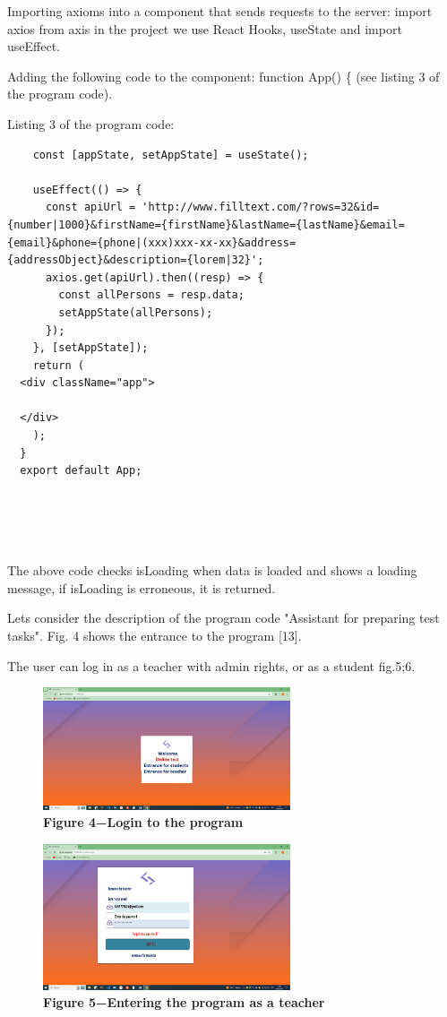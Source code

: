 Importing axioms into a component that sends requests to the server:
import axios from \textquotesingle axis\textquotesingle{} in the project
we use React Hooks, useState and import useEffect.

Adding the following code to the component: function App() \{ (see
listing 3 of the program code).

Listing 3 of the program code:


\begin{lstlisting}
	const [appState, setAppState] = useState();

	useEffect(() => {
	  const apiUrl = 'http://www.filltext.com/?rows=32&id={number|1000}&firstName={firstName}&lastName={lastName}&email={email}&phone={phone|(xxx)xxx-xx-xx}&address={addressObject}&description={lorem|32}';
	  axios.get(apiUrl).then((resp) => {
		const allPersons = resp.data;
		setAppState(allPersons);
	  });
	}, [setAppState]);
	return (
  <div className="app">
  
  </div>
	);
  }
  export default App;

	
  
  
\end{lstlisting}

The above code checks isLoading when data is loaded and shows a loading
message, if isLoading is erroneous, it is returned.

Let\textquotesingle s consider the description of the program code
"Assistant for preparing test tasks". Fig. 4 shows the entrance to the
program {[}13{]}.

The user can log in as a teacher with admin rights, or as a student fig.5;6.



\begin{figure}[H]
	\centering
	\includegraphics[height=0.35\textwidth, width=0.65\textwidth]{assets/129}
	\caption*{\bfseries Figure 4−Login to the program}
\end{figure}


\begin{figure}[H]
	\centering
	\includegraphics[height=0.35\textwidth, width=0.65\textwidth]{assets/130}
	\caption*{\bfseries Figure 5−Entering the program as a teacher}
\end{figure}



